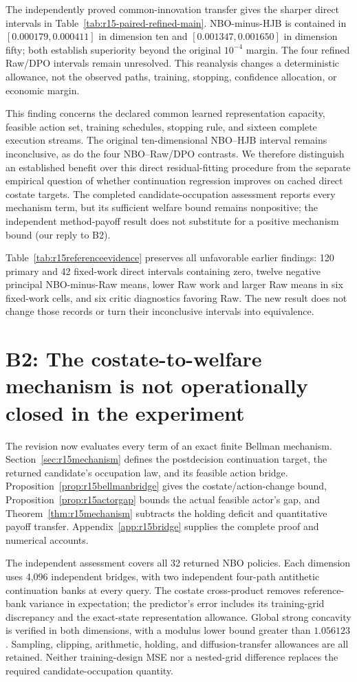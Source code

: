 The independently proved common-innovation transfer gives the sharper direct intervals in Table~\ref{tab:r15-paired-refined-main}. NBO-minus-HJB is contained in $[0.000179,0.000411]$ in dimension ten and $[0.001347,0.001650]$ in dimension fifty; both establish superiority beyond the original $10^{-4}$ margin. The four refined Raw/DPO intervals remain unresolved. This reanalysis changes a deterministic allowance, not the observed paths, training, stopping, confidence allocation, or economic margin.

This finding concerns the declared common learned representation capacity, feasible action set, training schedules, stopping rule, and sixteen complete execution streams. The original ten-dimensional NBO--HJB interval remains inconclusive, as do the four NBO--Raw/DPO contrasts. We therefore distinguish an established benefit over this direct residual-fitting procedure from the separate empirical question of whether continuation regression improves on cached direct costate targets. The completed candidate-occupation assessment reports every mechanism term, but its sufficient welfare bound remains nonpositive; the independent method-payoff result does not substitute for a positive mechanism bound (our reply to B2).

Table~\ref{tab:r15referenceevidence} preserves all unfavorable earlier findings: 120 primary and 42 fixed-work direct intervals containing zero, twelve negative principal NBO-minus-Raw means, lower Raw work and larger Raw means in six fixed-work cells, and six critic diagnostics favoring Raw. The new result does not change those records or turn their inconclusive intervals into equivalence.

\section*{B2: The costate-to-welfare mechanism is not operationally closed in the experiment}
The revision now evaluates every term of an exact finite Bellman mechanism. Section~\ref{sec:r15mechanism} defines the postdecision continuation target, the returned candidate's occupation law, and its feasible action bridge. Proposition~\ref{prop:r15bellmanbridge} gives the costate/action-change bound, Proposition~\ref{prop:r15actorgap} bounds the actual feasible actor's gap, and Theorem~\ref{thm:r15mechanism} subtracts the holding deficit and quantitative payoff transfer. Appendix~\ref{app:r15bridge} supplies the complete proof and numerical accounts.

The independent assessment covers all 32 returned NBO policies. Each dimension uses 4,096 independent bridges, with two independent four-path antithetic continuation banks at every query. The costate cross-product removes reference-bank variance in expectation; the predictor's error includes its training-grid discrepancy and the exact-state representation allowance. Global strong concavity is verified in both dimensions, with a modulus lower bound greater than $1.056123$. Sampling, clipping, arithmetic, holding, and diffusion-transfer allowances are all retained. Neither training-design MSE nor a nested-grid difference replaces the required candidate-occupation quantity.


